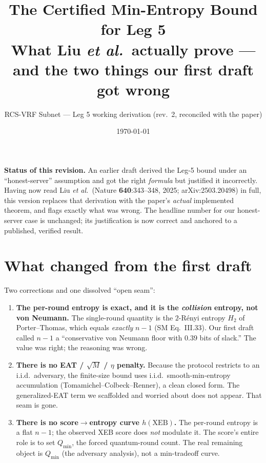 \documentclass[11pt]{article}
\title{\vspace{-1.5em}\textbf{The Certified Min-Entropy Bound for Leg 5}\\[0.3em]
\large What Liu \emph{et al.}\ actually prove --- and the two things our first draft got wrong}
\author{RCS-VRF Subnet --- Leg 5 working derivation (rev.\ 2, reconciled with the paper)}
\date{\today}
\theoremstyle{definition}
\theoremstyle{plain}
\newcommand{\Fxeb}{\mathrm{XEB}}
\newcommand{\Qmin}{Q_{\min}}
\begin{document}
\maketitle
\vspace{-1em}

\begin{keybox}
\textbf{Status of this revision.} An earlier draft derived the Leg-5 bound under an
``honest-server'' assumption and got the right \emph{formula} but justified it incorrectly.
Having now read Liu \emph{et al.}\ (Nature \textbf{640}:343--348, 2025; arXiv:2503.20498) in
full, this version replaces that derivation with the paper's \emph{actual} implemented theorem,
and flags exactly what was wrong. The headline number for our honest-server case is unchanged;
its justification is now correct and anchored to a published, verified result.
\end{keybox}

\section{What changed from the first draft}

\begin{warnbox}
Two corrections and one dissolved ``open seam'':
\begin{enumerate}[leftmargin=1.4em,itemsep=2pt]
\item \textbf{The per-round entropy is exact, and it is the \emph{collision} entropy, not von Neumann.}
The single-round quantity is the $2$-R\'enyi entropy $H_2$ of Porter--Thomas, which equals
\emph{exactly} $n-1$ (SM Eq.~III.33). Our first draft called $n-1$ a ``conservative von Neumann
floor with $0.39$ bits of slack.'' The value was right; the reasoning was wrong.
\item \textbf{There is no EAT / $\sqrt{M}$ / $\eta$ penalty.} Because the protocol restricts to an
i.i.d.\ adversary, the finite-size bound uses i.i.d.\ smooth-min-entropy accumulation
(Tomamichel--Colbeck--Renner), a clean closed form. The generalized-EAT term we scaffolded and
worried about does not appear. That seam is gone.
\item \textbf{There is no score$\to$entropy curve $h(\Fxeb)$.} The per-round entropy is a flat
$n-1$; the observed XEB score does \emph{not} modulate it. The score's entire role is to set
$\Qmin$, the forced quantum-round count. The real remaining object is $\Qmin$ (the adversary
analysis), not a min-tradeoff curve.
\end{enumerate}
\end{warnbox}
\end{document}
